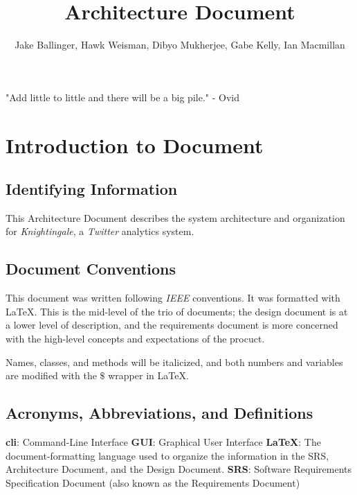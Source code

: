 \documentclass[a4paper, 12pt]{article}
\title{Architecture Document}
\author{Jake Ballinger, Hawk Weisman, Dibyo Mukherjee, Gabe Kelly, Ian Macmillan}
\begin{document}
\maketitle

\begin{center}
\centering  "Add little to little and there will be a big pile." \newline
\centering - Ovid
\end{center}

\section{Introduction to Document} \label{sec:intro}
\subsection{Identifying Information} \label{sec:identify}
\begin{adjustwidth}{2em}{0pt}
This Architecture Document describes the system architecture and organization for \textit{Knightingale}, a \textit{Twitter} analytics system.
\end{adjustwidth}

\subsection{Document Conventions} \label{sec:conventions}
\begin{adjustwidth}{2em}{0pt}
This document was written following \textit{IEEE} conventions. It was formatted with \LaTeX. This is the mid-level of the trio of documents; the design document is at a lower level of description, and the requirements document is more concerned with the high-level concepts and expectations of the procuct. \newline

\noindent Names, classes, and methods will be italicized, and both numbers and variables are modified with the $\$$ wrapper in \LaTeX.
\end{adjustwidth}

\subsection{Acronyms, Abbreviations, and Definitions} \label{sec:abbr}
\begin{adjustwidth}{2em}{0pt}
\textbf{cli}: Command-Line Interface \newline
\noindent \textbf{GUI}: Graphical User Interface \newline
\noindent \textbf{\LaTeX}: The document-formatting language used to organize the information in the SRS, Architecture Document, and the Design Document. \newline
\noindent \textbf{SRS}: Software Requirements Specification Document (also known as the Requirements Document)
\end{adjustwidth}
\end{document}
